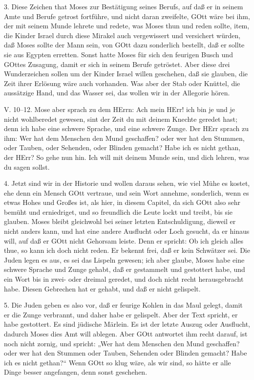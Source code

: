 3. Diese Zeichen that Moses zur Bestätigung seines Berufs, auf daß er in seinem Amte und Berufe getrost fortführe, und nicht daran zweifelte, GOtt wäre bei ihm, der mit seinem Munde lehrete und redete, was Moses thun und reden sollte, item, die Kinder Israel durch diese Mirakel auch vergewissert und versichert würden, daß Moses sollte der Mann sein, von GOtt dazu sonderlich bestellt, daß er sollte sie aus Egypten erretten. Sonst hatte Moses für sich den feurigen Busch und GOttes Zusagung, damit er sich in seinem Berufe getröstet. Aber diese drei Wunderzeichen sollen um der Kinder Israel willen geschehen, daß sie glauben, die Zeit ihrer Erlösung wäre auch vorhanden. Was aber der Stab oder Knüttel, die aussätzige Hand, und das Wasser sei, das wollen wir in der Allegorie hören.

\begin{schriftzitat}
V. 10–12. Mose aber sprach zu dem HErrn: Ach mein HErr! ich bin je und je nicht wohlberedet gewesen, sint der Zeit du mit deinem Knechte geredet hast; denn ich habe eine schwere Sprache, und eine schwere Zunge. Der HErr sprach zu ihm: Wer hat dem Menschen den Mund geschaffen? oder wer hat den Stummen, oder Tauben, oder Sehenden, oder Blinden gemacht? Habe ich es nicht gethan, der HErr? So gehe nun hin. Ich will mit deinem Munde sein, und dich lehren, was du sagen sollst.
\end{schriftzitat}

4. Jetzt sind wir in der Historie und wollen daraus sehen, wie viel Mühe es kostet, ehe denn ein Mensch GOtt vertraue, und sein Wort annehme, sonderlich, wenn es etwas Hohes und Großes ist, als hier, in diesem Capitel, da sich GOtt also sehr bemüht und erniedriget, und so freundlich die Leute lockt und treibt, bis sie glauben. Moses bleibt gleichwohl bei seiner letzten Entschuldigung, dieweil er nicht anders kann, und hat eine andere Ausflucht oder Loch gesucht, da er hinaus will, auf daß er GOtt nicht Gehorsam leiste. Denn er spricht: Ob ich gleich alles thue, so kann ich doch nicht reden. Er bekennt frei, daß er kein Schwätzer sei. Die Juden legen es aus, es sei das Lispeln gewesen; ich aber glaube, Moses habe eine schwere Sprache und Zunge gehabt, daß er gestammelt und gestottert habe, und ein Wort bis in zwei- oder dreimal geredet, und doch nicht recht herausgebracht habe. Diesen Gebrechen hat er gehabt, und daß er nicht gelispelt.

5. Die Juden geben es also vor, daß er feurige Kohlen in das Maul gelegt, damit er die Zunge verbrannt, und daher habe er gelispelt. Aber der Text spricht, er habe gestottert. Es sind jüdische Märlein. Es ist der letzte Auszug oder Ausflucht, dadurch Moses dies Amt will ablegen. Aber GOtt antwortet ihm recht darauf, ist noch nicht zornig, und spricht: „Wer hat dem Menschen den Mund geschaffen? oder wer hat den Stummen oder Tauben, Sehenden oder Blinden gemacht? Habe ich es nicht gethan?“ Wenn GOtt so klug wäre, als wir sind, so hätte er alle Dinge besser angefangen, denn sonst geschehen.

